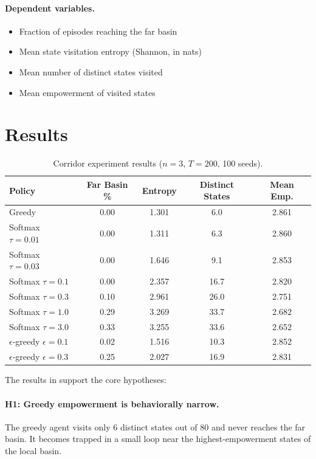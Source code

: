 \documentclass[11pt]{article}
\begin{document}
\paragraph{Dependent variables.}
\begin{itemize}
  \item Fraction of episodes reaching the far basin
  \item Mean state visitation entropy (Shannon, in nats)
  \item Mean number of distinct states visited
  \item Mean empowerment of visited states
\end{itemize}

\section{Results}
\label{sec:results}

\begin{table}[h]
\centering
\caption{Corridor experiment results ($n=3$, $T=200$, 100 seeds).}
\label{tab:results}
\begin{tabular}{@{}lcccc@{}}
\toprule
Policy & Far Basin \% & Entropy & Distinct States & Mean Emp. \\
\midrule
Greedy              & 0.00 & 1.301 &  6.0 & 2.861 \\
Softmax $\tau=0.01$ & 0.00 & 1.311 &  6.3 & 2.860 \\
Softmax $\tau=0.03$ & 0.00 & 1.646 &  9.1 & 2.853 \\
Softmax $\tau=0.1$  & 0.00 & 2.357 & 16.7 & 2.820 \\
Softmax $\tau=0.3$  & 0.10 & 2.961 & 26.0 & 2.751 \\
Softmax $\tau=1.0$  & 0.29 & 3.269 & 33.7 & 2.682 \\
Softmax $\tau=3.0$  & 0.33 & 3.255 & 33.6 & 2.652 \\
\midrule
$\epsilon$-greedy $\epsilon=0.1$ & 0.02 & 1.516 & 10.3 & 2.852 \\
$\epsilon$-greedy $\epsilon=0.3$ & 0.25 & 2.027 & 16.9 & 2.831 \\
\bottomrule
\end{tabular}
\end{table}

The results in  support the core hypotheses:

\paragraph{H1: Greedy empowerment is behaviorally narrow.}
The greedy agent visits only 6 distinct states out of 80 and never
reaches the far basin.  It becomes trapped in a small loop near the
highest-empowerment states of the local basin.
\end{document}

